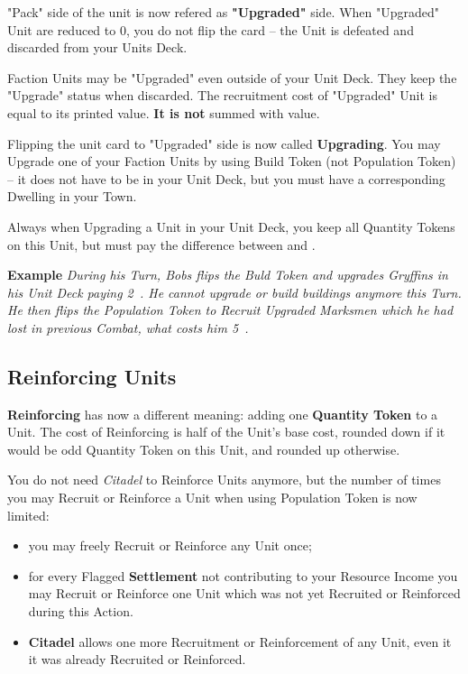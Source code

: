 \begin{multicols*}{2}
    "Pack" side of the unit is now refered as \textbf{"Upgraded"} side. When "Upgraded" Unit  are reduced to $0$, you do not flip the card -- the Unit is defeated and discarded from your Units Deck.
    
    Faction Units may be "Upgraded" even outside of your Unit Deck. They keep the "Upgrade" status when discarded. The recruitment cost of "Upgraded" Unit is equal to its printed  value. \textbf{It is not} summed with  value.
    
    \medskip
    
    
    Flipping the unit card to "Upgraded" side is now called \textbf{Upgrading}. You may Upgrade one of your Faction Units by using Build Token (not Population Token) -- it does not have to be in your Unit Deck, but you must have a corresponding Dwelling in your Town. 
    
    Always when Upgrading a Unit in your Unit Deck, you keep all Quantity Tokens on this Unit, but must pay the difference between  and .
    
    \textbf{Example} \textit{During his Turn, Bobs flips the Buld Token and upgrades Gryffins in his Unit Deck paying 2~. He cannot upgrade or build buildings anymore this Turn. He then flips the Population Token to Recruit Upgraded Marksmen which he had lost in previous Combat, what costs him 5~.}
    
    \subsection*{Reinforcing Units}
    
    \textbf{Reinforcing} has now a different meaning: adding one \textbf{Quantity Token} to a Unit. The cost of Reinforcing is half of the Unit's base  cost, rounded down if it would be odd Quantity Token on this Unit, and rounded up otherwise.
    
    \medskip
    
    
    You do not need \textit{Citadel} to Reinforce Units anymore, but the number of times you may Recruit or Reinforce a Unit when using Population Token is now limited:
    \begin{itemize}
        \item you may freely Recruit or Reinforce any Unit once;
        \item for every Flagged \textbf{Settlement} not contributing to your Resource Income you may Recruit or Reinforce one Unit which was not yet Recruited or Reinforced during this Action.
        \item \textbf{Citadel} allows one more Recruitment or Reinforcement of any Unit, even it it was already Recruited or Reinforced.
    \end{itemize}
    

\end{multicols*}
